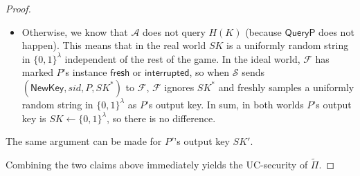 \documentclass{article}
\newcommand{\adv}{\mathcal{A}}
\renewcommand{\sim}{\mathcal{S}}
\newcommand{\func}{\mathcal{F}}
\newcommand{\NewKey}{\mathsf{NewKey}}
\newcommand{\fresh}{\mathsf{fresh}}
\newcommand{\interrupted}{\mathsf{interrupted}}
\begin{document}
\begin{proof}
\begin{enumerate}
\begin{itemize}
        \item Otherwise, we know that $\adv$ does not query $H(K)$ (because $\mathsf{QueryP}$ does not happen). This means that in the real world $SK$ is a uniformly random string in $\{0,1\}^\lambda$ independent of the rest of the game. In the ideal world, $\func$ has marked $P$'s instance $\fresh$ or $\interrupted$, so when $\sim$ sends $(\NewKey, sid, P, SK^*)$ to $\func$, $\func$ ignores $SK^*$ and freshly samples a uniformly random string in $\{0,1\}^\lambda$ as $P$'s output key. In sum, in both worlds $P$'s output key is $SK \gets \{0,1\}^\lambda$, so there is no difference.
      \end{itemize}
      The same argument can be made for $P'$'s output key $SK'$.
\end{enumerate}

Combining the two claims above immediately yields the UC-security of $\tilde{\Pi}$.
\end{proof}
\end{document}
